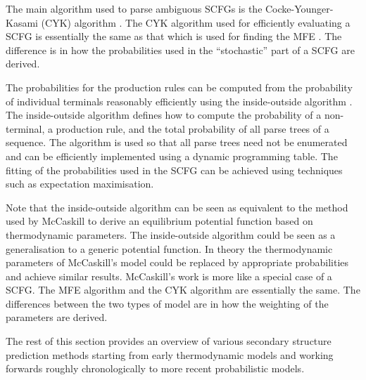 \documentclass[journal]{IEEEtran}
\begin{document}
The main algorithm used to parse ambiguous SCFGs is the Cocke-Younger-Kasami (CYK) algorithm \cite{giegerich2014introduction, cocke1969programming, younger1967recognition, kasami1965efficient} . The CYK algorithm used for efficiently evaluating a SCFG is essentially the same as that which is used for finding the MFE \cite{zuker1981optimal}. The difference is in how the probabilities used in the ``stochastic'' part of a SCFG are derived.

The probabilities for the production rules can be computed from the probability of individual terminals reasonably efficiently using the inside-outside algorithm \cite{lari1990estimation}. The inside-outside algorithm defines how to compute the probability of a non-terminal, a production rule, and the total probability of all parse trees of a sequence. The algorithm is used so that all parse trees need not be enumerated and can be efficiently implemented using a dynamic programming table. The fitting of the probabilities used in the SCFG can be achieved using techniques such as expectation maximisation. 

Note that the inside-outside algorithm can be seen as equivalent to the method used by McCaskill \cite{mccaskill1990equilibrium} to derive an equilibrium potential function based on thermodynamic parameters. The inside-outside algorithm could be seen as a generalisation to a generic potential function. In theory the thermodynamic parameters of McCaskill's model could be replaced by appropriate probabilities and achieve similar results. McCaskill's work is more like a special case of a SCFG. The MFE algorithm and the CYK algorithm are essentially the same. The differences between the two types of model are in how the weighting of the parameters are derived.

The rest of this section provides an overview of various secondary structure prediction methods starting from early thermodynamic models and working forwards roughly chronologically to more recent probabilistic models.
\end{document}
